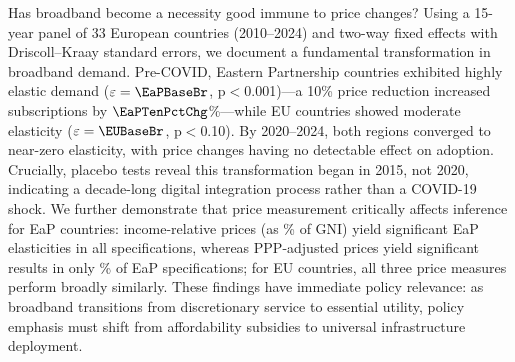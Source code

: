 Has broadband become a necessity good immune to price changes? Using a 15-year panel of 33 European countries (2010--2024) and two-way fixed effects with Driscoll--Kraay standard errors, we document a fundamental transformation in broadband demand. Pre-COVID, Eastern Partnership countries exhibited highly elastic demand ($\varepsilon = \EaPBaseBr$, p$<$0.001)---a 10\% price reduction increased subscriptions by $\EaPTenPctChg$\%---while EU countries showed moderate elasticity ($\varepsilon = \EUBaseBr$, p$<$0.10). By 2020--2024, both regions converged to near-zero elasticity, with price changes having no detectable effect on adoption. Crucially, placebo tests reveal this transformation began in 2015, not 2020, indicating a decade-long digital integration process rather than a COVID-19 shock. We further demonstrate that price measurement critically affects inference for EaP countries: income-relative prices (as \% of GNI) yield significant EaP elasticities in all specifications, whereas PPP-adjusted prices yield significant results in only \PctPPPSigEaP\% of EaP specifications; for EU countries, all three price measures perform broadly similarly. These findings have immediate policy relevance: as broadband transitions from discretionary service to essential utility, policy emphasis must shift from affordability subsidies to universal infrastructure deployment.
